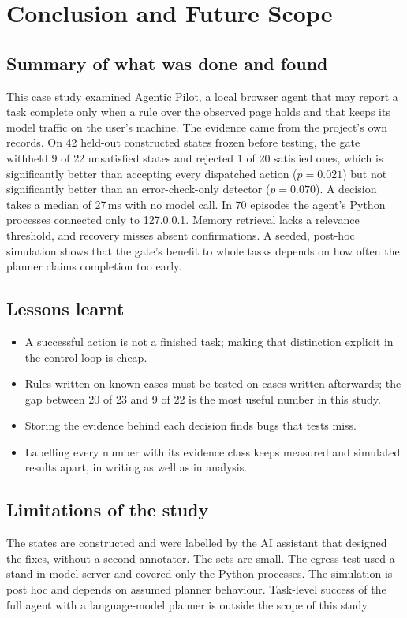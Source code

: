 \chapter{Conclusion and Future Scope}
\label{ch:concl}

\section{Summary of what was done and found}
This case study examined Agentic Pilot, a local browser agent that may report a task complete only when a rule over the observed page holds and that keeps its model traffic on the user's machine. The evidence came from the project's own records. On 42 held-out constructed states frozen before testing, the gate withheld 9 of 22 unsatisfied states and rejected 1 of 20 satisfied ones, which is significantly better than accepting every dispatched action ($p=0.021$) but not significantly better than an error-check-only detector ($p=0.070$). A decision takes a median of 27\,ms with no model call. In 70 episodes the agent's Python processes connected only to 127.0.0.1. Memory retrieval lacks a relevance threshold, and recovery misses absent confirmations. A seeded, post-hoc simulation shows that the gate's benefit to whole tasks depends on how often the planner claims completion too early.

\section{Lessons learnt}
\begin{itemize}
\item A successful action is not a finished task; making that distinction explicit in the control loop is cheap.
\item Rules written on known cases must be tested on cases written afterwards; the gap between 20 of 23 and 9 of 22 is the most useful number in this study.
\item Storing the evidence behind each decision finds bugs that tests miss.
\item Labelling every number with its evidence class keeps measured and simulated results apart, in writing as well as in analysis.
\end{itemize}

\section{Limitations of the study}
The states are constructed and were labelled by the AI assistant that designed the fixes, without a second annotator. The sets are small. The egress test used a stand-in model server and covered only the Python processes. The simulation is post hoc and depends on assumed planner behaviour. Task-level success of the full agent with a language-model planner is outside the scope of this study.

